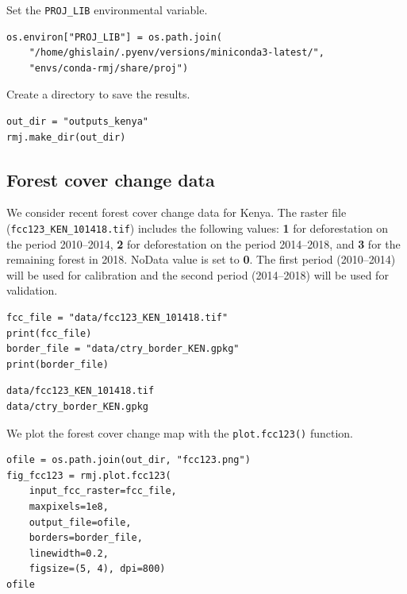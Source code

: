 \documentclass[paper=a4, 12pt, DIV=12]{scrartcl}
\begin{document}
Set the \texttt{PROJ\_LIB} environmental variable.

\begin{verbatim}
os.environ["PROJ_LIB"] = os.path.join(
    "/home/ghislain/.pyenv/versions/miniconda3-latest/",
    "envs/conda-rmj/share/proj")
\end{verbatim}

Create a directory to save the results.

\begin{verbatim}
out_dir = "outputs_kenya"
rmj.make_dir(out_dir)
\end{verbatim}

\subsection{Forest cover change data}
\label{sec:org2e5338d}

We consider recent forest cover change data for Kenya. The raster file (\texttt{fcc123\_KEN\_101418.tif}) includes the following values: \textbf{1} for deforestation on the period 2010--2014, \textbf{2} for deforestation on the period 2014--2018, and \textbf{3} for the remaining forest in 2018. NoData value is set to \textbf{0}. The first period (2010--2014) will be used for calibration and the second period (2014--2018) will be used for validation.

\begin{verbatim}
fcc_file = "data/fcc123_KEN_101418.tif"
print(fcc_file)
border_file = "data/ctry_border_KEN.gpkg"
print(border_file)
\end{verbatim}

\begin{verbatim}
data/fcc123_KEN_101418.tif
data/ctry_border_KEN.gpkg
\end{verbatim}


We plot the forest cover change map with the \texttt{plot.fcc123()} function.

\begin{verbatim}
ofile = os.path.join(out_dir, "fcc123.png")
fig_fcc123 = rmj.plot.fcc123(
    input_fcc_raster=fcc_file,
    maxpixels=1e8,
    output_file=ofile,
    borders=border_file,
    linewidth=0.2,
    figsize=(5, 4), dpi=800)
ofile
\end{verbatim}
\end{document}
